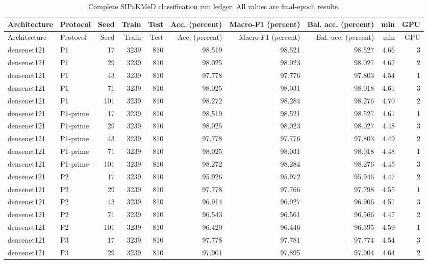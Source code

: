\begin{longtable}{p{2.25cm}p{1.1cm}rrrrrrrr}
\caption{Complete SIPaKMeD classification run ledger. All values are final-epoch results.}\label{s1:tab:all-class-runs}\\
\toprule
Architecture & Protocol & Seed & Train & Test & Acc. (percent) & Macro-F1 (percent) & Bal. acc. (percent) & min & GPU \\
\midrule
\endfirsthead
\toprule
Architecture & Protocol & Seed & Train & Test & Acc. (percent) & Macro-F1 (percent) & Bal. acc. (percent) & min & GPU \\
\midrule
\endhead
\bottomrule
\endfoot
densenet121 & P1 & 17 & 3239 & 810 & 98.519 & 98.521 & 98.527 & 4.66 & 3 \\ 
densenet121 & P1 & 29 & 3239 & 810 & 98.025 & 98.023 & 98.027 & 4.62 & 2 \\ 
densenet121 & P1 & 43 & 3239 & 810 & 97.778 & 97.776 & 97.803 & 4.54 & 1 \\ 
densenet121 & P1 & 71 & 3239 & 810 & 98.025 & 98.031 & 98.018 & 4.61 & 3 \\ 
densenet121 & P1 & 101 & 3239 & 810 & 98.272 & 98.284 & 98.276 & 4.70 & 2 \\ 
densenet121 & P1-prime & 17 & 3239 & 810 & 98.519 & 98.521 & 98.527 & 4.61 & 1 \\ 
densenet121 & P1-prime & 29 & 3239 & 810 & 98.025 & 98.023 & 98.027 & 4.48 & 3 \\ 
densenet121 & P1-prime & 43 & 3239 & 810 & 97.778 & 97.776 & 97.803 & 4.49 & 2 \\ 
densenet121 & P1-prime & 71 & 3239 & 810 & 98.025 & 98.031 & 98.018 & 4.48 & 1 \\ 
densenet121 & P1-prime & 101 & 3239 & 810 & 98.272 & 98.284 & 98.276 & 4.45 & 3 \\ 
densenet121 & P2 & 17 & 3239 & 810 & 95.926 & 95.972 & 95.946 & 4.47 & 2 \\ 
densenet121 & P2 & 29 & 3239 & 810 & 97.778 & 97.766 & 97.798 & 4.55 & 1 \\ 
densenet121 & P2 & 43 & 3239 & 810 & 96.914 & 96.927 & 96.906 & 4.51 & 3 \\ 
densenet121 & P2 & 71 & 3239 & 810 & 96.543 & 96.561 & 96.566 & 4.47 & 2 \\ 
densenet121 & P2 & 101 & 3239 & 810 & 96.420 & 96.446 & 96.395 & 4.59 & 1 \\ 
densenet121 & P3 & 17 & 3239 & 810 & 97.778 & 97.781 & 97.774 & 4.54 & 3 \\ 
densenet121 & P3 & 29 & 3239 & 810 & 97.901 & 97.895 & 97.904 & 4.64 & 2 \\ 

\end{longtable}
